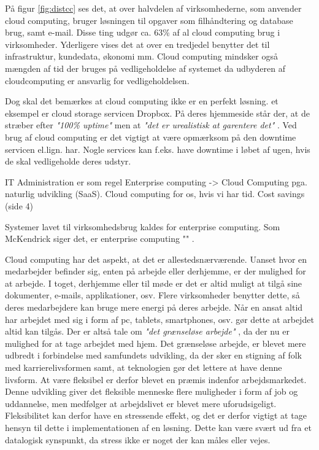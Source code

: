 \newpage
På figur \ref{fig:distcc} ses det, at over halvdelen af virksomhederne, som anvender cloud computing, bruger løsningen til opgaver som filhåndtering og database brug, samt e-mail. Disse ting udgør ca. 63\% af al cloud computing brug i virksomheder. Yderligere vises det at over en tredjedel benytter det til infrastruktur, kundedata, økonomi mm. Cloud computing mindsker også mængden af tid der bruges på vedligeholdelse af systemet da udbyderen af cloudcomputing er ansvarlig for vedligeholdelsen. 

Dog skal det bemærkes at cloud computing ikke er en perfekt løsning. et eksempel er cloud storage servicen Dropbox. På deres hjemmeside står der, at de stræber efter \textit{"100\% uptime"} men at \textit{"det er urealistisk at garentere det"} \citep{drpbx_downtime}. Ved brug af cloud computing er det vigtigt at være opmærksom på den downtime servicen el.lign. har. Nogle services kan f.eks. have downtime i løbet af ugen, hvis de skal vedligeholde deres udstyr.

IT Administration er som regel Enterprise computing ->
Cloud Computing pga. naturlig udvikling (SaaS). 
Cloud computing for os, hvis vi har tid.
Cost savings (side 4)



Systemer lavet til virksomhedsbrug kaldes for enterprise computing. Som McKendrick siger det, er enterprise  computing "" \citep{McKendrick2014} .

Cloud computing har det aspekt, at det er allestedsnærværende. Uanset hvor en medarbejder befinder sig, enten på arbejde eller derhjemme, er der mulighed for at arbejde. I toget, derhjemme eller til møde er det er altid muligt at tilgå sine dokumenter, e-mails, applikationer, osv. Flere virksomheder benytter dette, så deres medarbejdere kan bruge mere energi på deres arbejde. Når en ansat altid har arbejdet med sig i form af pc, tablets, smartphones, osv. gør dette at arbejdet altid kan tilgås. Der er altså tale om \textit{"det grænseløse arbejde"} \citep{SystimeStress}, da der nu er mulighed for at tage arbejdet med hjem. Det grænseløse arbejde, er blevet mere udbredt i forbindelse med samfundets udvikling, da der sker en stigning af folk med karrierelivsformen samt, at teknologien gør det lettere at have denne livsform. At være fleksibel er derfor blevet en præmis indenfor arbejdsmarkedet. Denne udvikling giver det fleksible menneske flere muligheder i form af job og uddannelse, men medfølger at arbejdslivet er blevet mere uforudsigeligt. Fleksibilitet kan derfor have en stressende effekt, og det er derfor vigtigt at tage hensyn til dette i implementationen af en løsning. Dette kan være svært ud fra et datalogisk synspunkt, da stress ikke er noget der kan måles eller vejes. \citep{SystimeStress}

